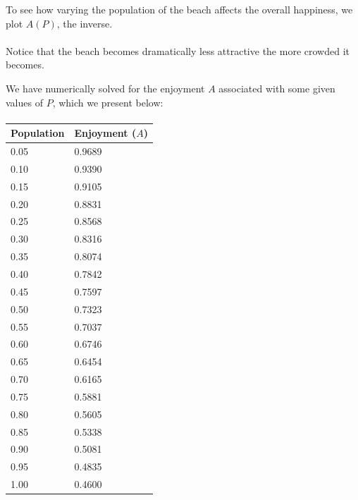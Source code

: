 \documentclass{article}
\begin{document}
To see how varying the population of the beach affects the overall happiness,
	we plot $A(P)$, the inverse.

\paragraph{}

Notice that the beach becomes dramatically less attractive the more
	crowded it becomes.

We have numerically solved for the enjoyment $A$ associated with some given 
	values of $P$, which we present below:

\paragraph{}
\begin{tabular}{ l | l}
Population & Enjoyment ($A$) \\
\hline
0.05 & 0.9689 \\
0.10 & 0.9390 \\
0.15 & 0.9105 \\
0.20 & 0.8831 \\
0.25 & 0.8568 \\
0.30 & 0.8316 \\
0.35 & 0.8074 \\
0.40 & 0.7842 \\
0.45 & 0.7597 \\
0.50 & 0.7323 \\
0.55 & 0.7037 \\
0.60 & 0.6746 \\
0.65 & 0.6454 \\
0.70 & 0.6165 \\
0.75 & 0.5881 \\
0.80 & 0.5605 \\
0.85 & 0.5338 \\
0.90 & 0.5081 \\
0.95 & 0.4835 \\
1.00 & 0.4600 
\end{tabular}
\end{document}
